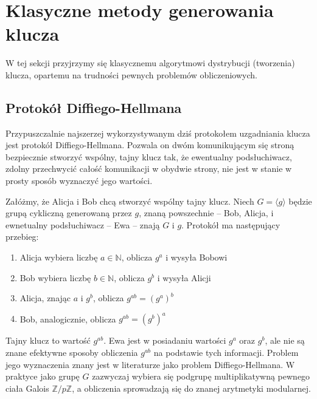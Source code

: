 \documentclass[10pt]{article}
\begin{document}

\section{Klasyczne metody generowania klucza}

W tej sekcji przyjrzymy się klasycznemu algorytmowi dystrybucji (tworzenia) klucza, opartemu
na trudności pewnych problemów obliczeniowych.

\subsection{Protokół Diffiego-Hellmana}

Przypuszczalnie najszerzej wykorzystywanym dziś protokołem uzgadniania klucza jest protokół 
Diffiego-Hellmana\cite{dh76}. Pozwala on dwóm komunikującym się stroną bezpiecznie stworzyć wspólny, 
tajny klucz tak, że ewentualny podsłuchiwacz, zdolny przechwycić całość komunikacji w obydwie strony,
nie jest w stanie w prosty sposób wyznaczyć jego wartości.

Załóżmy, że Alicja i Bob chcą stworzyć wspólny tajny klucz. Niech \(G=\langle g\rangle\) będzie grupą
cykliczną generowaną przez \(g\), znaną powszechnie -- Bob, Alicja, i ewnetualny podsłuchiwacz -- Ewa
-- znają \(G\) i \(g\). Protokół ma następujący przebieg:

\begin{enumerate}
  \item Alicja wybiera liczbę \(a\in\mathbb{N}\), oblicza \(g^a\) i wysyła Bobowi
  \item Bob wybiera liczbę \(b\in\mathbb{N}\), oblicza \(g^b\) i wysyła Alicji
  \item Alicja, znając \(a\) i \(g^b\), oblicza \(g^{ab}=\left(g^a\right)^b\)
  \item Bob, analogicznie, oblicza \(g^{ab}=\left(g^b\right)^a\)
\end{enumerate}

Tajny klucz to wartość \(g^{ab}\). Ewa jest w posiadaniu wartości \(g^a\) oraz \(g^b\), ale nie są
znane efektywne sposoby obliczenia \(g^{ab}\) na podstawie tych informacji. Problem jego wyznaczenia
znany jest w literaturze jako problem Diffiego-Hellmana\footnotemark. W praktyce jako grupę \(G\)
zazwyczaj wybiera się podgrupę multiplikatywną pewnego ciała Galois \(\mathbb{Z}/p\mathbb{Z}\), a
obliczenia sprowadzają się do znanej arytmetyki modularnej.
\end{document}
